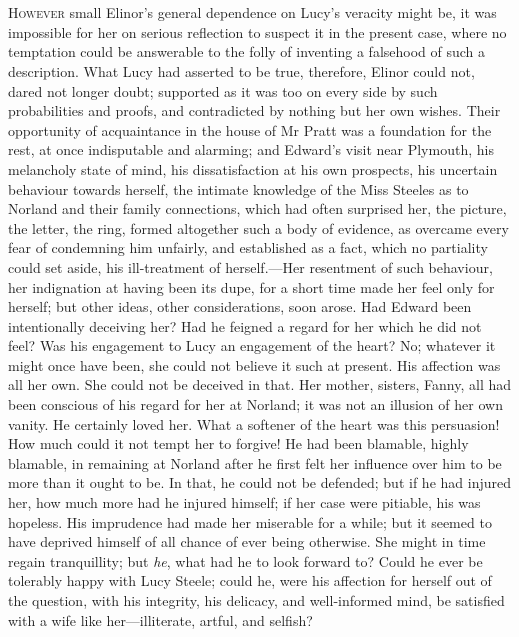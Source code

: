 \chapter[Chapter \thechapter]{}
\lettrine[lines=4,lraise=0.3]{H}{owever} small Elinor’s general dependence on Lucy’s veracity might be, it was impossible for her on serious reflection to suspect it in the present case, where no temptation could be answerable to the folly of inventing a falsehood of such a description. What Lucy had asserted to be true, therefore, Elinor could not, dared not longer doubt; supported as it was too on every side by such probabilities and proofs, and contradicted by nothing but her own wishes. Their opportunity of acquaintance in the house of Mr Pratt was a foundation for the rest, at once indisputable and alarming; and Edward’s visit near Plymouth, his melancholy state of mind, his dissatisfaction at his own prospects, his uncertain behaviour towards herself, the intimate knowledge of the Miss Steeles as to Norland and their family connections, which had often surprised her, the picture, the letter, the ring, formed altogether such a body of evidence, as overcame every fear of condemning him unfairly, and established as a fact, which no partiality could set aside, his ill-treatment of herself.—Her resentment of such behaviour, her indignation at having been its dupe, for a short time made her feel only for herself; but other ideas, other considerations, soon arose. Had Edward been intentionally deceiving her? Had he feigned a regard for her which he did not feel? Was his engagement to Lucy an engagement of the heart? No; whatever it might once have been, she could not believe it such at present. His affection was all her own. She could not be deceived in that. Her mother, sisters, Fanny, all had been conscious of his regard for her at Norland; it was not an illusion of her own vanity. He certainly loved her. What a softener of the heart was this persuasion! How much could it not tempt her to forgive! He had been blamable, highly blamable, in remaining at Norland after he first felt her influence over him to be more than it ought to be. In that, he could not be defended; but if he had injured her, how much more had he injured himself; if her case were pitiable, his was hopeless. His imprudence had made her miserable for a while; but it seemed to have deprived himself of all chance of ever being otherwise. She might in time regain tranquillity; but \textit{he}, what had he to look forward to? Could he ever be tolerably happy with Lucy Steele; could he, were his affection for herself out of the question, with his integrity, his delicacy, and well-informed mind, be satisfied with a wife like her—illiterate, artful, and selfish?

